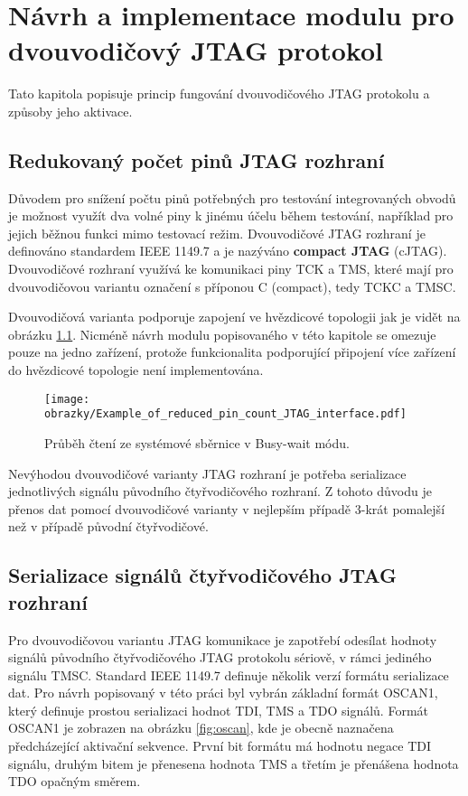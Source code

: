 \chapter{Návrh a implementace modulu pro dvouvodičový JTAG protokol}
Tato kapitola popisuje princip fungování dvouvodičového \acs{JTAG} protokolu a způsoby jeho aktivace.

\section{Redukovaný počet pinů \acs{JTAG} rozhraní}	\label{sec:2w_interface}
Důvodem pro snížení počtu pinů potřebných pro testování integrovaných obvodů je možnost využít dva volné piny k jinému účelu během testování, například pro jejich běžnou funkci mimo testovací režim. Dvouvodičové \acs{JTAG} rozhraní je definováno standardem IEEE 1149.7 a je nazýváno \textbf{compact \acs{JTAG}} (c\acs{JTAG}). Dvouvodičové rozhraní využívá ke komunikaci piny \acs{TCK} a \acs{TMS}, které mají pro dvouvodičovou variantu označení s příponou C (compact), tedy TCKC a TMSC. \cite{IEEE_1149-7} \cite{JTAG}

Dvouvodičová varianta podporuje zapojení ve hvězdicové topologii jak je vidět na obrázku \ref{fig:star2_sch}. Nicméně návrh modulu popisovaného v této kapitole se omezuje pouze na jedno zařízení, protože funkcionalita podporující připojení více zařízení do hvězdicové topologie není implementována.

\begin{figure}[!h]
  \begin{center}
    \texttt{[image: obrazky/Example\_of\_reduced\_pin\_count\_JTAG\_interface.pdf]}
  \end{center}
  \caption{Průběh čtení ze systémové sběrnice v Busy-wait módu.}
	\label{fig:star2_sch}
\end{figure}

Nevýhodou dvouvodičové varianty \acs{JTAG} rozhraní je potřeba serializace jednotlivých signálu původního čtyřvodičového rozhraní. Z tohoto důvodu je přenos dat pomocí dvouvodičové varianty v nejlepším případě 3-krát pomalejší než v případě původní čtyřvodičové. \cite{IEEE_1149-7}

\section{Serializace signálů čtyřvodičového \acs{JTAG} rozhraní}	\label{sec:oscan1} 
Pro dvouvodičovou variantu \acs{JTAG} komunikace je zapotřebí odesílat hodnoty signálů původního čtyřvodičového \acs{JTAG} protokolu sériově, v rámci jediného signálu TMSC. Standard IEEE 1149.7 definuje několik verzí formátu serializace dat. Pro návrh popisovaný v této práci byl vybrán základní formát OSCAN1, který definuje prostou serializaci hodnot \acs{TDI}, \acs{TMS} a \acs{TDO} signálů. Formát OSCAN1 je zobrazen na obrázku \ref{fig:oscan}, kde je obecně naznačena předcházející aktivační sekvence. První bit formátu má hodnotu negace \acs{TDI} signálu, druhým bitem je přenesena hodnota \acs{TMS} a třetím je přenášena hodnota \acs{TDO}	opačným směrem. \cite{IEEE_1149-7}

